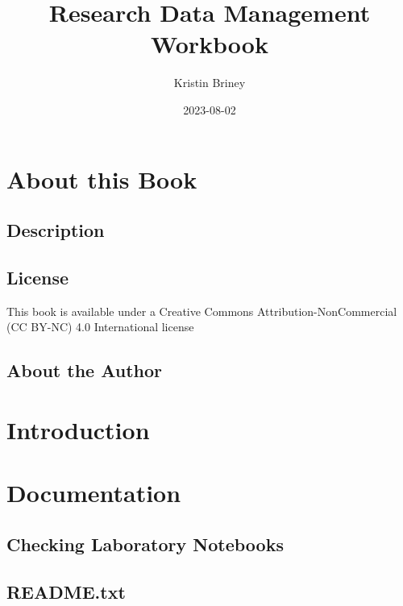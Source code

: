 \documentclass[
]{book}
\title{Research Data Management Workbook}
\author{Kristin Briney}
\date{2023-08-02}
\begin{document}
\maketitle

{
\setcounter{tocdepth}{1}
\tableofcontents
}
\hypertarget{about-this-book}{%
\chapter*{About this Book}\label{about-this-book}}

\hypertarget{description}{%
\section*{Description}\label{description}}

\hypertarget{license}{%
\section*{License}\label{license}}

This book is available under a Creative Commons Attribution-NonCommercial (CC BY-NC) 4.0 International license

\hypertarget{about-the-author}{%
\section*{About the Author}\label{about-the-author}}

\hypertarget{introduction}{%
\chapter{Introduction}\label{introduction}}

\hypertarget{documentation}{%
\chapter{Documentation}\label{documentation}}

\hypertarget{checking-laboratory-notebooks}{%
\section{Checking Laboratory Notebooks}\label{checking-laboratory-notebooks}}

\hypertarget{readme.txt}{%
\section{README.txt}\label{readme.txt}}
\end{document}
